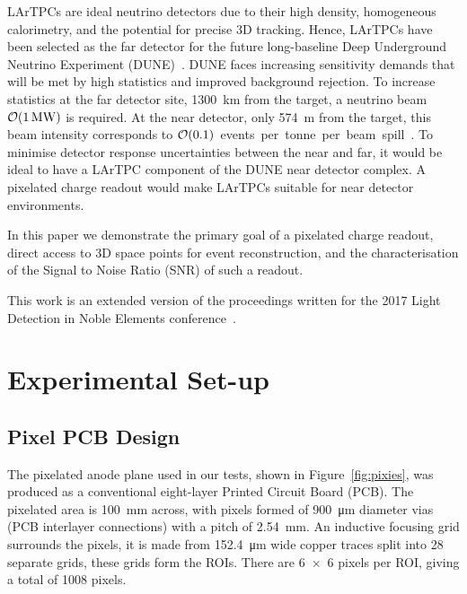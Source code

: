 \documentclass[instruments,article,submit,moreauthors,pdftex]{Definitions/mdpi}
\begin{document}
LArTPCs are ideal neutrino detectors due to their high density, homogeneous calorimetry, and the potential for precise 3D tracking.
Hence, LArTPCs have been selected as the far detector for the future long-baseline Deep Underground Neutrino Experiment (DUNE)~\cite{DUNE}.  
DUNE faces increasing sensitivity demands that will be met by high statistics and improved background rejection. 
To increase statistics at the far detector site, \SI{1300}{\kilo\metre} from the target, a neutrino beam $\order{\SI{1}{\mega\watt}}$ is required.
At the near detector, only \SI{574}{\metre} from the target, this beam intensity corresponds to $\order{0.1}$~events~per~tonne~per~beam~spill~\cite{DUNE2,DUNE3}.
To minimise detector response uncertainties between the near and far, it would be ideal to have a LArTPC component of the DUNE near detector complex.
A pixelated charge readout would make LArTPCs suitable for near detector environments.

In this paper we demonstrate the primary goal of a pixelated charge readout, direct access to 3D space points for event reconstruction, and the characterisation of the Signal to Noise Ratio (SNR) of such a readout. 

This work is an extended version of the proceedings written for the 2017 Light Detection in Noble Elements conference~\cite{ldine}.  

\section{Experimental Set-up}

\subsection{Pixel PCB Design} \label{sec:PCB}

The pixelated anode plane used in our tests, shown in Figure~\ref{fig:pixies}, was produced as a conventional eight-layer Printed Circuit Board (PCB). 
The pixelated area is \SI{100}{\milli\metre} across, with pixels formed of \SI{900}{\micro\metre} diameter vias (PCB interlayer connections) with a pitch of \SI{2.54}{\milli\metre}.
An inductive focusing grid surrounds the pixels, it is made from \SI{152.4}{\micro\metre} wide copper traces split into 28 separate grids, these grids form the ROIs.
There are \num{6 x 6} pixels per ROI, giving a total of 1008 pixels. 
\end{document}
